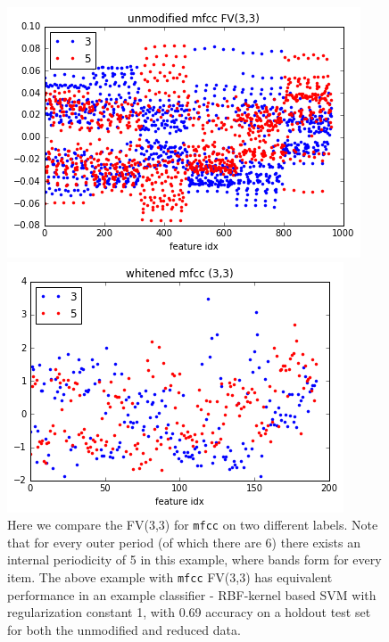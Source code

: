 \documentclass[9pt]{article}
\begin{document}
\begin{figure}[H]
    \centering
    
    \begin{minipage}[b]{0.3\textwidth}
        \includegraphics[width=\textwidth]{unmodified-mfcc3-3.png}
    \end{minipage}
    \hfill
    \begin{minipage}[b]{0.3\textwidth}
        \includegraphics[width=\textwidth]{whitened-riffled-mfcc3-3.png}
    \end{minipage}
    
    \label{fig:fv33}
    \caption{Here we compare the FV(3,3) for \texttt{mfcc} on two different labels. Note that for every outer period (of which there are 6) there exists an internal periodicity of 5 in this example, where bands form for every item. The above example with \texttt{mfcc} FV(3,3) has equivalent performance in an example classifier - RBF-kernel based SVM with regularization constant 1, with 0.69 accuracy on a holdout test set for both the unmodified and reduced data.}
\end{figure}
\end{document}
